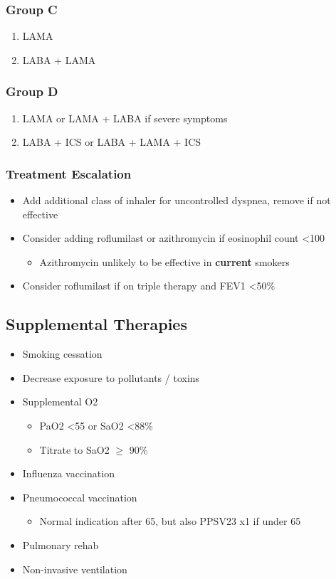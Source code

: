 \documentclass[main.tex]{subfiles}
\begin{document}
\subsubsection{Group C}
\begin{enumerate}[noitemsep]
	\item LAMA
	\item LABA + LAMA
\end{enumerate}

\subsubsection{Group D}
\begin{enumerate}[noitemsep]
	\item LAMA or LAMA + LABA if severe symptoms
	\item LABA + ICS or LABA + LAMA + ICS
\end{enumerate}

\subsubsection{Treatment Escalation}
\begin{itemize}[noitemsep]
	\item Add additional class of inhaler for uncontrolled dyspnea, remove if not effective
	\item Consider adding roflumilast or azithromycin if eosinophil count \textless 100
	\begin{itemize}[noitemsep]
		\item Azithromycin unlikely to be effective in \textbf{current} smokers
	\end{itemize}
	\item Consider roflumilast if on triple therapy and FEV1 \textless 50\%
\end{itemize}


\subsection{Supplemental Therapies}
\begin{itemize}[noitemsep]
	\item Smoking cessation
	\item Decrease exposure to pollutants / toxins
	\item Supplemental O2
	\begin{itemize}[noitemsep]
		\item PaO2 \textless 55 or SaO2 \textless 88\%
		\item Titrate to SaO2 $\ge$ 90\%
	\end{itemize}
	\item Influenza vaccination
	\item Pneumococcal vaccination
	\begin{itemize}[noitemsep]
		\item Normal indication after 65, but also PPSV23 x1 if under 65
	\end{itemize}
	\item Pulmonary rehab
	\item Non-invasive ventilation
\end{itemize}
\end{document}

